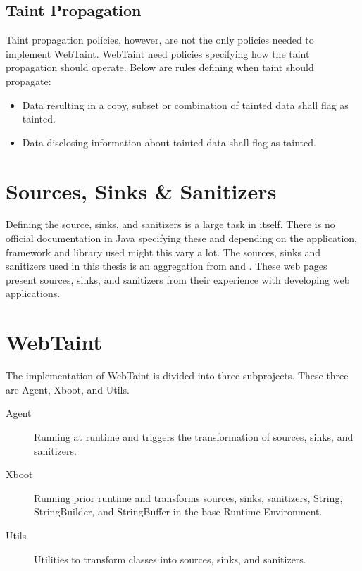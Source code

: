 \subsection{Taint Propagation}
Taint propagation policies, however, are not the only policies needed to implement WebTaint. WebTaint need policies specifying how the taint propagation should operate. Below are rules defining when taint should propagate:

\hfill
\begin{itemize}
    \item Data resulting in a copy, subset or combination of tainted data shall flag as tainted.
    \item Data disclosing information about tainted data shall flag as tainted.
\end{itemize}
\hfill



\section{Sources, Sinks \& Sanitizers}
\label{souresSS}
Defining the source, sinks, and sanitizers is a large task in itself. There is no official documentation in Java specifying these and depending on the application, framework and library used might this vary a lot.  The sources, sinks and sanitizers used in this thesis is an aggregation from \textcite{sssCodeMaster} and \textcite{sssOWASP}. These web pages present sources, sinks, and sanitizers from their experience with developing web applications. 



\section{WebTaint}
\label{SoftwareArchitecture}
The implementation of WebTaint is divided into three subprojects. These three are Agent, Xboot, and Utils. 

\hfill
\begin{description}
    \item[Agent] Running at runtime and triggers the transformation of sources, sinks, and sanitizers.
    \item[Xboot] Running prior runtime and transforms sources, sinks, sanitizers, String, StringBuilder, and StringBuffer in the base Runtime Environment.
    \item[Utils] Utilities to transform classes into sources, sinks, and sanitizers. 
\end{description}
\hfill

